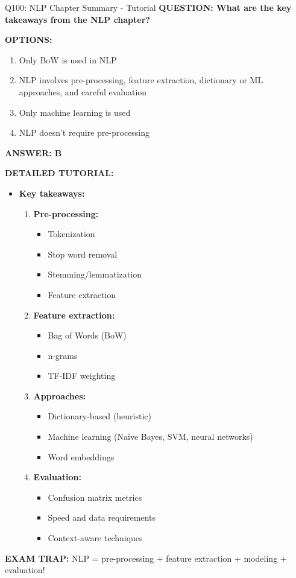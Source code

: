 \documentclass[8pt]{beamer}
\begin{document}
	\begin{frame}{Q100: NLP Chapter Summary - Tutorial}
		\fontsize{6.5}{7.5}\selectfont
		\textbf{QUESTION: What are the key takeaways from the NLP chapter?}
		
		\vspace{0.1cm}
		\textbf{OPTIONS:}
		\begin{enumerate}
			\item Only BoW is used in NLP
			\item NLP involves pre-processing, feature extraction, dictionary or ML approaches, and careful evaluation
			\item Only machine learning is used
			\item NLP doesn't require pre-processing
		\end{enumerate}
		
		\vspace{0.1cm}
		\textcolor{myblue}{\textbf{ANSWER: B}}
		
		\vspace{0.1cm}
		\textbf{DETAILED TUTORIAL:}
		\begin{itemize}
			\item \textbf{Key takeaways:}
			\begin{enumerate}
				\item \textbf{Pre-processing:}
				\begin{itemize}
					\item Tokenization
					\item Stop word removal
					\item Stemming/lemmatization
					\item Feature extraction
				\end{itemize}
				\item \textbf{Feature extraction:}
				\begin{itemize}
					\item Bag of Words (BoW)
					\item n-grams
					\item TF-IDF weighting
				\end{itemize}
				\item \textbf{Approaches:}
				\begin{itemize}
					\item Dictionary-based (heuristic)
					\item Machine learning (Naïve Bayes, SVM, neural networks)
					\item Word embeddings
				\end{itemize}
				\item \textbf{Evaluation:}
				\begin{itemize}
					\item Confusion matrix metrics
					\item Speed and data requirements
					\item Context-aware techniques
				\end{itemize}
			\end{enumerate}
		\end{itemize}
		
		\textcolor{myred}{\textbf{EXAM TRAP:}} NLP = \textcolor{myblue}{pre-processing + feature extraction + modeling + evaluation}!
	\end{frame}
	
\end{document}
